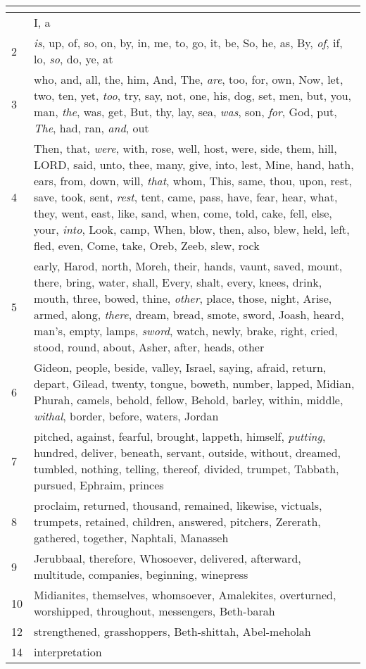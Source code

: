 \begin{center}
\begin{longtable}{l|p{3.75in}}
\hline \multicolumn{2}{c}{{ }} \\ \hline
\endfoot 
1 & I, a\\ \hline 
2 & \emph{is}, up, of, so, on, by, in, me, to, go, it, be, So, he, as, By, \emph{of}, if, lo, \emph{so}, do, ye, at\\ \hline 
3 & who, and, all, the, him, And, The, \emph{are}, too, for, own, Now, let, two, ten, yet, \emph{too}, try, say, not, one, his, dog, set, men, but, you, man, \emph{the}, was, get, But, thy, lay, sea, \emph{was}, son, \emph{for}, God, put, \emph{The}, had, ran, \emph{and}, out\\ \hline 
4 & Then, that, \emph{were}, with, rose, well, host, were, side, them, hill, LORD, said, unto, thee, many, give, into, lest, Mine, hand, hath, ears, from, down, will, \emph{that}, whom, This, same, thou, upon, rest, save, took, sent, \emph{rest}, tent, came, pass, have, fear, hear, what, they, went, east, like, sand, when, come, told, cake, fell, else, your, \emph{into}, Look, camp, When, blow, then, also, blew, held, left, fled, even, Come, take, Oreb, Zeeb, slew, rock\\ \hline 
5 & early, Harod, north, Moreh, their, hands, vaunt, saved, mount, there, bring, water, shall, Every, shalt, every, knees, drink, mouth, three, bowed, thine, \emph{other}, place, those, night, Arise, armed, along, \emph{there}, dream, bread, smote, sword, Joash, heard, man's, empty, lamps, \emph{sword}, watch, newly, brake, right, cried, stood, round, about, Asher, after, heads, other\\ \hline 
6 & Gideon, people, beside, valley, Israel, saying, afraid, return, depart, Gilead, twenty, tongue, boweth, number, lapped, Midian, Phurah, camels, behold, fellow, Behold, barley, within, middle, \emph{withal}, border, before, waters, Jordan\\ \hline 
7 & pitched, against, fearful, brought, lappeth, himself, \emph{putting}, hundred, deliver, beneath, servant, outside, without, dreamed, tumbled, nothing, telling, thereof, divided, trumpet, Tabbath, pursued, Ephraim, princes\\ \hline 
8 & proclaim, returned, thousand, remained, likewise, victuals, trumpets, retained, children, answered, pitchers, Zererath, gathered, together, Naphtali, Manasseh\\ \hline 
9 & Jerubbaal, therefore, Whosoever, delivered, afterward, multitude, companies, beginning, winepress\\ \hline 
10 & Midianites, themselves, whomsoever, Amalekites, overturned, worshipped, throughout, messengers, Beth-barah\\ \hline 
12 & strengthened, grasshoppers, Beth-shittah, Abel-meholah\\ \hline 
14 & interpretation\\ \hline 
\end{longtable}
\end{center}





